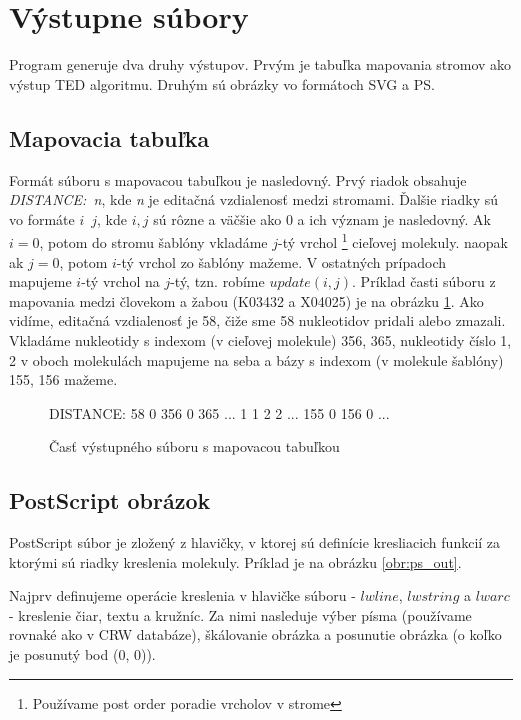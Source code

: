 \section{Výstupne súbory}

Program generuje dva druhy výstupov. Prvým je tabuľka mapovania stromov
ako výstup TED algoritmu. Druhým sú obrázky vo formátoch SVG a PS.

\subsection{Mapovacia tabuľka}

Formát súboru s mapovacou tabuľkou je nasledovný. Prvý riadok obsahuje
\mbox{\textit{DISTANCE: n}}, kde \textit{n} je editačná vzdialenosť
medzi stromami.
Ďalšie riadky sú vo formáte \mbox{$i$ $j$}, kde \mbox{$i, j$} sú rôzne a väčšie ako 0
a ich význam je nasledovný.
Ak \mbox{$i = 0$}, potom do stromu šablóny vkladáme $j$-tý vrchol%
\footnote{Používame post order poradie vrcholov v strome} cieľovej molekuly.
naopak ak \mbox{$j = 0$}, potom $i$-tý vrchol zo šablóny mažeme. V ostatných prípadoch
mapujeme $i$-tý vrchol na $j$-tý, tzn. robíme \mbox{$update(i, j)$}.
Príklad časti súboru z mapovania medzi človekom a žabou (K03432 a X04025)
je na obrázku \ref{obr:mapping_format}.
Ako vidíme, editačná vzdialenosť je 58, čiže sme 58 nukleotidov pridali alebo zmazali.
Vkladáme nukleotidy s indexom (v cieľovej molekule) 356, 365,
nukleotidy číslo 1, 2 v oboch molekulách mapujeme na seba a bázy
s indexom (v molekule šablóny) 155, 156 mažeme.

\begin{figure}
\begin{code}[fontsize=\scriptsize, frame=none, samepage=true]
DISTANCE: 58
0 356
0 365
  ...
1 1
2 2
  ...
155 0
156 0
  ...
\end{code}
\caption{Časť výstupného súboru s mapovacou tabuľkou}
\label{obr:mapping_format}
\end{figure}




\subsection{PostScript obrázok}

PostScript súbor je zložený z hlavičky, v ktorej sú definície kresliacich funkcií za
ktorými sú riadky kreslenia molekuly. Príklad je na obrázku \ref{obr:ps_out}.

Najprv definujeme operácie kreslenia v hlavičke súboru - $lwline$,
$lwstring$ a $lwarc$ - kreslenie čiar, textu a kružníc.
Za nimi nasleduje výber písma (používame rovnaké ako v CRW databáze),
škálovanie obrázka a posunutie obrázka (o koľko je posunutý bod (0, 0)).

